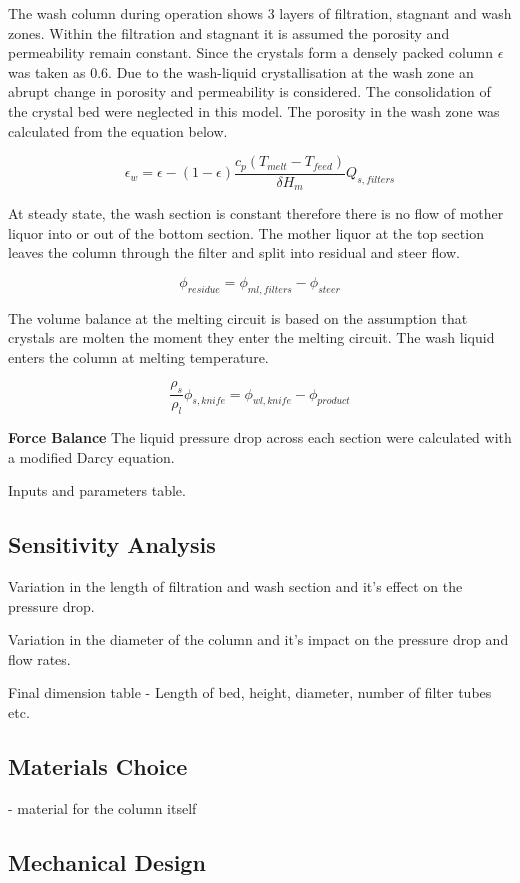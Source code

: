The wash column during operation shows 3 layers of filtration, stagnant and wash zones. Within the filtration and stagnant it is assumed the porosity and permeability remain constant. Since the crystals form a densely packed column $\epsilon$ was taken as 0.6. Due to the wash-liquid crystallisation at the wash zone an abrupt change in porosity and permeability is considered. The consolidation of the crystal bed were neglected in this model. The porosity in the wash zone was calculated from the equation below. 

\begin{equation}
\epsilon_{w}= \epsilon-(1-\epsilon)\frac{c_p(T_{melt}-T_{feed})}{\delta H_m}Q_{s,filters}
\end{equation}

At steady state, the wash section is constant therefore there is no flow of mother liquor into or out of the bottom section. The mother liquor at the top section leaves the column through the filter and split into residual and steer flow. 

\begin{equation}
\phi_{residue}= \phi_{ml,filters} - \phi_{steer}
\end{equation}

The volume balance at the melting circuit is based on the assumption that crystals are molten the moment they enter the melting circuit. The wash liquid enters the column at melting temperature. 

\begin{equation}
\frac{\rho_s}{\rho_l}\phi_{s,knife}= \phi_{wl,knife} - \phi_{product}
\end{equation}


\textbf{Force Balance}
The liquid pressure drop across each section were calculated with a modified Darcy equation.
















Inputs and parameters table. 

\subsection{Sensitivity Analysis}
Variation in the length of filtration and wash section and it's effect on the pressure drop. 

Variation in the diameter of the column and it's impact on the pressure drop and flow rates. 

Final dimension table - Length of bed, height, diameter, number of filter tubes etc. 



\subsection{Materials Choice}
- material for the column itself 

\subsection{Mechanical Design}

